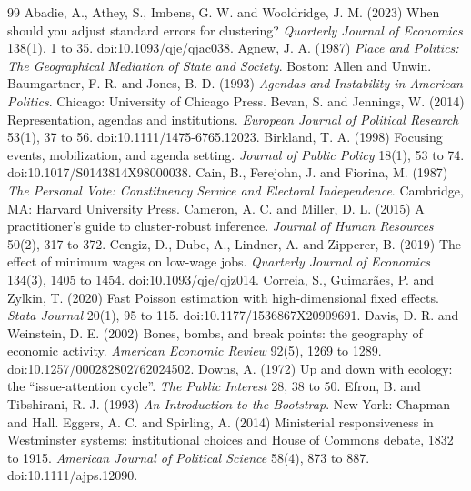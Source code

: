 \documentclass[11pt,a4paper]{article}
\begin{document}
\begin{thebibliography}{99}
 Abadie, A., Athey, S., Imbens, G. W. and Wooldridge, J. M. (2023) When should you adjust standard errors for clustering? \textit{Quarterly Journal of Economics} 138(1), 1 to 35. doi:10.1093/qje/qjac038.
 Agnew, J. A. (1987) \textit{Place and Politics: The Geographical Mediation of State and Society}. Boston: Allen and Unwin.
 Baumgartner, F. R. and Jones, B. D. (1993) \textit{Agendas and Instability in American Politics}. Chicago: University of Chicago Press.
 Bevan, S. and Jennings, W. (2014) Representation, agendas and institutions. \textit{European Journal of Political Research} 53(1), 37 to 56. doi:10.1111/1475-6765.12023.
 Birkland, T. A. (1998) Focusing events, mobilization, and agenda setting. \textit{Journal of Public Policy} 18(1), 53 to 74. doi:10.1017/S0143814X98000038.
 Cain, B., Ferejohn, J. and Fiorina, M. (1987) \textit{The Personal Vote: Constituency Service and Electoral Independence}. Cambridge, MA: Harvard University Press.
 Cameron, A. C. and Miller, D. L. (2015) A practitioner's guide to cluster-robust inference. \textit{Journal of Human Resources} 50(2), 317 to 372.
 Cengiz, D., Dube, A., Lindner, A. and Zipperer, B. (2019) The effect of minimum wages on low-wage jobs. \textit{Quarterly Journal of Economics} 134(3), 1405 to 1454. doi:10.1093/qje/qjz014.
 Correia, S., Guimar\~aes, P. and Zylkin, T. (2020) Fast Poisson estimation with high-dimensional fixed effects. \textit{Stata Journal} 20(1), 95 to 115. doi:10.1177/1536867X20909691.
 Davis, D. R. and Weinstein, D. E. (2002) Bones, bombs, and break points: the geography of economic activity. \textit{American Economic Review} 92(5), 1269 to 1289. doi:10.1257/000282802762024502.
 Downs, A. (1972) Up and down with ecology: the ``issue-attention cycle''. \textit{The Public Interest} 28, 38 to 50.
 Efron, B. and Tibshirani, R. J. (1993) \textit{An Introduction to the Bootstrap}. New York: Chapman and Hall.
 Eggers, A. C. and Spirling, A. (2014) Ministerial responsiveness in Westminster systems: institutional choices and House of Commons debate, 1832 to 1915. \textit{American Journal of Political Science} 58(4), 873 to 887. doi:10.1111/ajps.12090.

\end{thebibliography}
\end{document}

